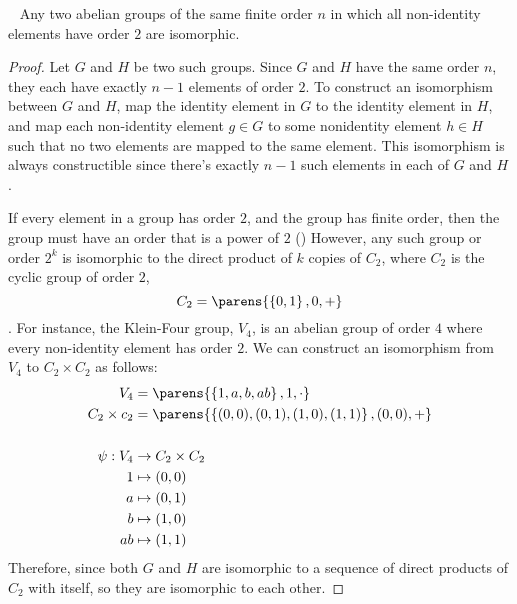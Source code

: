 \begin{claim}~\label{claim:abelian-order-two-finite-isomorphic}
  Any two abelian groups of the same finite order $n$ in which all non-identity elements
  have order $2$ are isomorphic.

  \begin{proof}
    Let $G$ and $H$ be two such groups.
    Since $G$ and $H$ have the same order $n$, they each have exactly $n-1$ elements
    of order $2$.
    To construct an isomorphism between $G$ and $H$, map the identity element in $G$
    to the identity element in $H$, and map each non-identity element $g \in G$
    to some nonidentity element $h \in H$ such that no two elements are mapped to the same element.
    This isomorphism is always constructible since there's exactly $n-1$ such elements
    in each of $G$ and $H$.

    If every element in a group has order $2$, and the group has finite order,
    then the group must have an order that is a power of $2$
    ()
    However, any such group or order $2^k$ is isomorphic to the direct
    product of $k$ copies of $C_2$,
    where $C_2$ is the cyclic group of order $2$, \[ C_2 = \parens{ \set{0, 1}, 0, + } \].
    For instance, the Klein-Four group, $V_4$, is an abelian group of order $4$
    where every non-identity element has order $2$.
    We can construct an isomorphism from $V_4$ to $C_2 \times C_2$ as follows:
    \begin{align*}
      V_4 &= \parens{ \set{1, a, b, ab}, 1, \cdot } \\
      C_2 \times c_2 &= \parens{ \set{(0, 0), (0, 1), (1, 0), (1, 1)}, (0, 0), + }\\ \\
      \psi : V_4 &\to C_2 \times C_2 \\
      1 &\mapsto (0, 0) \\
      a &\mapsto (0, 1) \\
      b &\mapsto (1, 0) \\
      ab &\mapsto (1, 1) \\
    \end{align*}
    Therefore, since both $G$ and $H$ are isomorphic to a sequence of direct products of $C_2$
    with itself, so they are isomorphic to each other. 
  \end{proof}
\end{claim}

